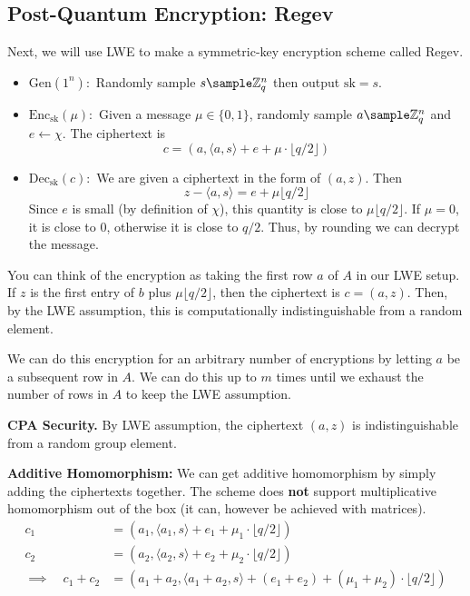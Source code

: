 \subsection{Post-Quantum Encryption: Regev}

Next, we will use LWE to make a symmetric-key encryption scheme called Regev.

\begin{itemize}
    \item $\text{Gen}(1^n):$ Randomly sample $s \sample \ZZ_q^n$ then output $\text{sk} = s$.
    \item $\text{Enc}_{\text{sk}}(\mu):$ Given a message $\mu \in \{0, 1\}$, randomly sample $a \sample \ZZ_q^n$ and $e \gets \chi$. The ciphertext is
    \[ c = (a, \langle a, s \rangle + e + \mu \cdot \lfloor q / 2 \rfloor)\]
    \item $\text{Dec}_\text{sk}(c):$ We are given a ciphertext in the form of $(a, z)$. Then \[ z - \langle a, s\rangle = e + \mu \lfloor q / 2 \rfloor\]
    Since $e$ is small (by definition of $\chi$), this quantity is close to $\mu \lfloor q/2 \rfloor $. If $\mu =0$, it is close to 0, otherwise it is close to $q/2$. Thus, by rounding we can decrypt the message.
\end{itemize}

You can think of the encryption as taking the first row $a$ of $A$ in our LWE setup. If $z$ is the first entry of $b$ plus $\mu \lfloor q/2 \rfloor$, then the ciphertext is $c = (a, z)$. Then, by the LWE assumption, this is computationally indistinguishable from a random element.

\begin{center}
    \def\svgwidth{0.75\columnwidth}
    
\end{center}

We can do this encryption for an arbitrary number of encryptions by letting $a$ be a subsequent row in $A$. We can do this up to $m$ times until we exhaust the number of rows in $A$ to keep the LWE assumption.

\textbf{CPA Security.} By LWE assumption, the ciphertext $(a, z)$ is indistinguishable from a random group element.

\textbf{Additive Homomorphism:} We can get additive homomorphism by simply adding the ciphertexts together. The scheme does \textbf{not} support multiplicative homomorphism out of the box (it can, however be achieved with matrices).
\begin{align*}
    c_1 &= (a_1, \langle a_1, s\rangle + e_1 + \mu_1 \cdot \lfloor q/2 \rfloor)\\
    c_2 &= (a_2, \langle a_2, s \rangle + e_2 + \mu_2 \cdot \lfloor q/2 \rfloor)\\
    \implies \quad c_1 + c_2 &= (a_1 + a_2, \langle a_1 + a_2, s \rangle + (e_1 + e_2) + (\mu_1 + \mu_2) \cdot \lfloor q/2 \rfloor)
\end{align*}

